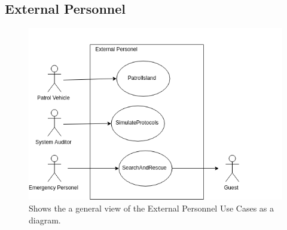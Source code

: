 \documentclass[12pt]{article}
\begin{document}
\subsection{External Personnel}
\begin{figure}[H]
    \centerline{\includegraphics[scale=.30]{Use_Cases__External.png}}
    \caption{Shows the a general view of the External Personnel Use Cases as a diagram.}
    \label{fig:usecaseexternal}
\end{figure}
\end{document}
